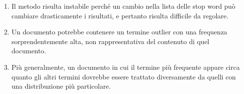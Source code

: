 \documentclass[\main/main.tex]{subfiles}
\begin{document}
\begin{multicols}{2}
\begin{observation}
\begin{enumerate}
        \item Il metodo risulta instabile perché un cambio nella lista delle stop word può cambiare drasticamente i risultati, e pertanto risulta difficile da regolare.
        \item Un documento potrebbe contenere un termine outlier con una frequenza sorprendentemente alta, non rappresentativa del contenuto di quel documento.
        \item Più generalmente, un documento in cui il termine più frequente appare circa quanto gli altri termini dovrebbe essere trattato diversamente da quelli con una distribuzione più particolare.
    \end{enumerate}
\end{observation}
\end{multicols}
\end{document}
